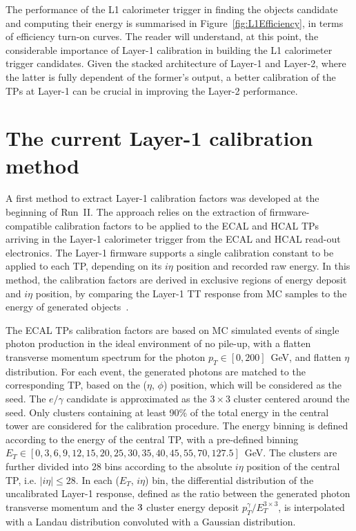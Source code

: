 \bigbreak

The performance of the L1 calorimeter trigger in finding the objects candidate and computing their energy is summarised in Figure~\ref{fig:L1Efficiency}, in terms of efficiency turn-on curves.
The reader will understand, at this point, the considerable importance of Layer-1 calibration in building the L1 calorimeter trigger candidates. 
Given the stacked architecture of Layer-1 and Layer-2, where the latter is fully dependent of the former's output, a better calibration of the TPs at Layer-1 can be crucial in improving the Layer-2 performance.

\section{The current Layer-1 calibration method}
\label{sec:The current Layer-1 calibration}

A first method to extract Layer-1 calibration factors was developed at the beginning of Run~II. 
The approach relies on the extraction of firmware-compatible calibration factors to be applied to the ECAL and HCAL TPs arriving in the Layer-1 calorimeter trigger from the ECAL and HCAL read-out electronics.
The Layer-1 firmware supports a single calibration constant to be applied to each TP, depending on its $i\eta$ position and recorded raw energy.
In this method, the calibration factors are derived in exclusive regions of energy deposit and $i\eta$ position, by comparing the Layer-1 TT response from MC samples to the energy of generated objects~\cite{Sirunyan_2020}.

The ECAL TPs calibration factors are based on MC simulated events of single photon production in the ideal environment of no pile-up, with a flatten transverse momentum spectrum for the photon $p_T \in [0,200]$~GeV, and flatten $\eta$ distribution.
For each event, the generated photons are matched to the corresponding TP, based on the ($\eta$, $\phi$) position, which will be considered as the seed. The $e/\gamma$ candidate is approximated as the $3\times3$ cluster centered around the seed. 
Only clusters containing at least 90\% of the total energy in the central tower are considered for the calibration procedure.
The energy binning is defined according to the energy of the central TP, with a pre-defined binning $E_T\in[0,3,6,9,12,15,20,25,30,35,40,45,55,70,127.5]$~GeV.
The clusters are further divided into 28 bins according to the absolute $i\eta$ position of the central TP, i.e. $|i\eta|\leq28$.
In each ($E_T$, $i\eta$) bin, the differential distribution of the uncalibrated Layer-1 response, defined as the ratio between the generated photon transverse momentum and the $3\time3$ cluster energy deposit $p_T^{\gamma}/E_T^{3\times3}$, is interpolated with a Landau distribution convoluted with a Gaussian distribution.

